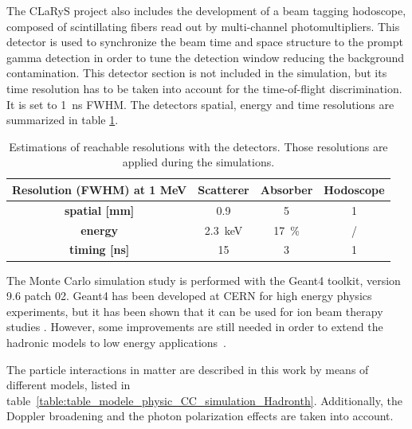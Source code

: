 The CLaRyS project also includes the development of a beam tagging hodoscope, composed of scintillating fibers read out by multi-channel photomultipliers. This detector is used to synchronize the beam time and space structure to the prompt gamma detection in order to tune the detection window reducing the background contamination. This detector section is not included in the simulation, but its time resolution has to be taken into account for the time-of-flight discrimination. It is set to 1~ns FWHM. The detectors spatial, energy and time resolutions are summarized in table \ref{table:table_resolution_detecteurs_CC_simulation_Hadronth}.

\begin{table} [!htbp]
\centering
\caption{Estimations of reachable resolutions with the detectors. Those resolutions are applied during the simulations.}
\begin{tabular}{cccc}
\hline
\textbf{Resolution (FWHM) at 1 MeV} & \textbf{Scatterer} & \textbf{Absorber} & \textbf{Hodoscope}\\
\hline 
\textbf{spatial [mm]	}			 &     0.9		 &  5 &	 1\\
\textbf{energy}				&	2.3~keV		&  17~\%	&	/\\
\textbf{timing [ns]}	        		&	15			&	3 	&  1\\
\hline
\end{tabular}
\label{table:table_resolution_detecteurs_CC_simulation_Hadronth}
\end{table}
    
The Monte Carlo simulation study is performed with the Geant4 toolkit, version 9.6 patch 02. Geant4 has been developed at CERN %
for high energy physics experiments, but it has been shown that it can be used for ion beam therapy studies \cite{cirrone_hadrontherapy_2011,toshito_new_2010}. However, some improvements are still needed in order to extend the hadronic models to low energy applications~\cite{dedes_assessment_2014, Pinto:2016aa}.

The particle interactions in matter are described in this work by means of different models, listed in table~\ref{table:table_modele_physic_CC_simulation_Hadronth}. Additionally, the Doppler broadening and the photon polarization effects are taken into account.
 


